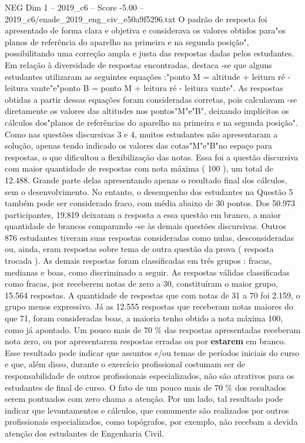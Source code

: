 \begin{textsample}{NEG Dim 1 – 2019\_c6 – Score -5.00 – 2019\_c6/enade\_2019\_eng\_civ\_e50a9f5296.txt}
O padrão de resposta foi apresentado de forma clara e objetiva e considerava os valores obtidos para"os planos de referência do aparelho na primeira e na segunda posição", possibilitando uma correção ampla e justa das respostas dadas pelos estudantes.
Em relação à diversidade de respostas encontradas, destaca -se que alguns estudantes utilizaram as seguintes equações :"ponto M = altitude + leitura ré - leitura vante"e"ponto B = ponto M + leitura ré - leitura vante".
As respostas obtidas a partir dessas equações foram consideradas corretas, pois calculavam -se diretamente os valores das altitudes nos pontos"M"e"B", deixando implícitos os cálculos dos"planos de referências do aparelho na primeira e na segunda posição".
Como nas questões discursivas 3 e 4, muitos estudantes não apresentaram a solução, apenas tendo indicado os valores das cotas"M"e"B"no espaço para respostas, o que dificultou a flexibilização das notas.
Essa foi a questão discursiva com maior quantidade de respostas com nota máxima ( 100 ), um total de 12.488.
Grande parte delas apresentando apenas o resultado final dos cálculos, sem o desenvolvimento.
No entanto, o desempenho dos estudantes na Questão 5 também pode ser considerado fraco, com média abaixo de 30 pontos.
Dos 50.973 participantes, 19.819 deixaram a resposta a essa questão em branco, a maior quantidade de brancos comparando -se às demais questões discursivas.
Outros 876 estudantes tiveram suas respostas consideradas como nulas, desconsideradas ou, ainda, eram respostas sobre tema de outra questão da prova ( resposta trocada ).
As demais respostas foram classificadas em três grupos : fracas, medianas e boas, como discriminado a seguir.
As respostas válidas classificadas como fracas, por receberem notas de zero a 30, constituíram o maior grupo, 15.564 respostas.
A quantidade de respostas que com notas de 31 a 70 foi 2.159, o grupo menos expressivo.
Já as 12.555 respostas que receberam notas maiores do que 71, foram consideradas boas, a maioria tenho obtido a nota máxima 100, como já apontado.
Um pouco mais de 70 \% das respostas apresentadas receberam nota zero, ou por apresentarem respostas erradas ou por \textbf{estarem} em branco.
Esse resultado pode indicar que assuntos e/ou temas de períodos iniciais do curso e que, além disso, durante o exercício profissional costumam ser de responsabilidade de outros profissionais especializados, não são atrativos para os estudantes de final de curso.
O fato de um pouco mais de 70 \% dos resultados serem pontuados com zero chama a atenção.
Por um lado, tal resultado pode indicar que levantamentos e cálculos, que comumente são realizados por outros profissionais especializados, como topógrafos, por exemplo, não recebam a devida atenção dos estudantes de Engenharia Civil.

\end{textsample}
